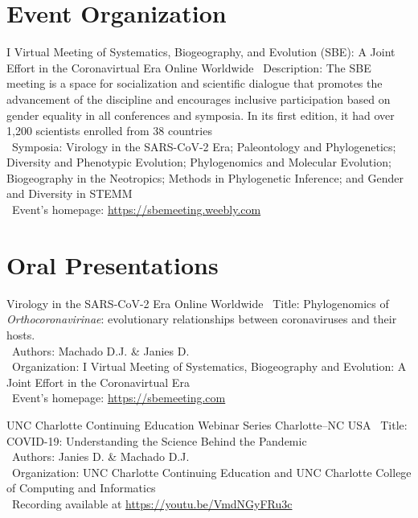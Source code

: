 

\section{Event Organization}

	{I Virtual Meeting of Systematics, Biogeography, and Evolution (SBE): A Joint Effort in the Coronavirtual Era}
	{Online}
	{Worldwide}
	{}
	{
		\textbullet~Description: The SBE meeting is a space for socialization and scientific dialogue that promotes the advancement of the discipline and encourages inclusive participation based on gender equality in all conferences and symposia. In its first edition, it had over 1,200 scientists enrolled from 38 countries\\
		\textbullet~Symposia: Virology in the SARS-CoV-2 Era; Paleontology and Phylogenetics; Diversity and Phenotypic Evolution; Phylogenomics and Molecular Evolution; Biogeography in the Neotropics; Methods in Phylogenetic Inference; and Gender and Diversity in STEMM\\
		\textbullet~Event's homepage: \url{https://sbemeeting.weebly.com}
	}


\section{Oral Presentations}

	{Virology in the SARS-CoV-2 Era}
	{Online}
	{Worldwide}
	{}
	{
		\textbullet~Title: Phylogenomics of \textit{Orthocoronavirinae}: evolutionary relationships between coronaviruses and their hosts.\\
		\textbullet~Authors: Machado D.J. \& Janies D.\\
		\textbullet~Organization: I Virtual Meeting of Systematics, Biogeography and Evolution: A Joint Effort in the Coronavirtual Era\\
		\textbullet~Event's homepage: \url{https://sbemeeting.com}
	}

\cventry{---}
	{UNC Charlotte Continuing Education Webinar Series}
	{Charlotte--NC}
	{USA}
	{}
	{
		\textbullet~Title: COVID-19: Understanding the Science Behind the Pandemic\\
		\textbullet~Authors: Janies D. \& Machado D.J.\\
		\textbullet~Organization: UNC Charlotte Continuing Education and UNC Charlotte College of Computing and Informatics\\
		\textbullet~Recording available at \url{https://youtu.be/VmdNGyFRu3c}
	}

